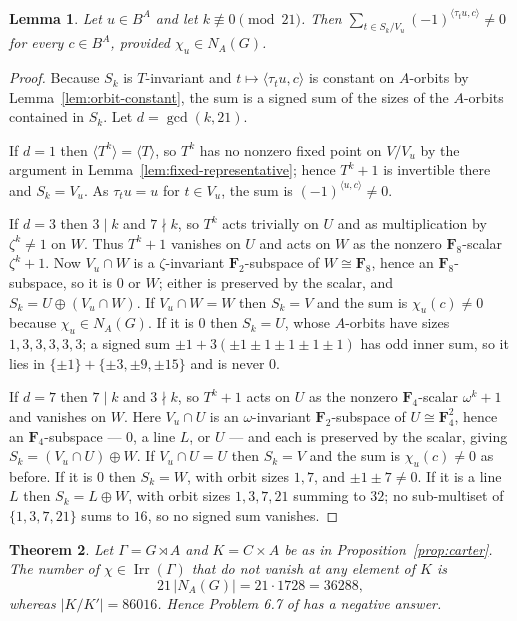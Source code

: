 \documentclass[11pt]{article}
\newtheorem{theorem}{Theorem}[section]
\newtheorem{lemma}[theorem]{Lemma}
\theoremstyle{definition}
\theoremstyle{remark}
\newcommand{\F}{\mathbf F}
\newcommand{\Irr}{\operatorname{Irr}}
\begin{document}
\begin{lemma}\label{lem:k-nonzero}
Let $u\in B^A$ and let $k\not\equiv0\pmod{21}$.  Then
$\sum_{t\in S_k/V_u}(-1)^{\langle\tau_tu,c\rangle}\neq0$ for every
$c\in B^A$, provided $\chi_u\in N_A(G)$.
\end{lemma}

\begin{proof}
Because $S_k$ is $T$-invariant and $t\mapsto\langle\tau_tu,c\rangle$ is
constant on $A$-orbits by Lemma~\ref{lem:orbit-constant}, the sum is a
signed sum of the sizes of the $A$-orbits contained in $S_k$.  Let
$d=\gcd(k,21)$.

If $d=1$ then $\langle T^k\rangle=\langle T\rangle$, so $T^k$ has no
nonzero fixed point on $V/V_u$ by the argument in
Lemma~\ref{lem:fixed-representative}; hence $T^k+1$ is invertible there
and $S_k=V_u$.  As $\tau_tu=u$ for $t\in V_u$, the sum is
$(-1)^{\langle u,c\rangle}\neq0$.

If $d=3$ then $3\mid k$ and $7\nmid k$, so $T^k$ acts trivially on $U$
and as multiplication by $\zeta^k\neq1$ on $W$.  Thus $T^k+1$ vanishes
on $U$ and acts on $W$ as the nonzero $\F_8$-scalar $\zeta^k+1$.  Now
$V_u\cap W$ is a $\zeta$-invariant $\F_2$-subspace of $W\cong\F_8$,
hence an $\F_8$-subspace, so it is $0$ or $W$; either is preserved by
the scalar, and $S_k=U\oplus(V_u\cap W)$.  If $V_u\cap W=W$ then
$S_k=V$ and the sum is
$\chi_u(c)\neq0$ because $\chi_u\in N_A(G)$.  If it is $0$ then $S_k=U$,
whose $A$-orbits have sizes $1,3,3,3,3,3$; a signed sum
$\pm1+3(\pm1\pm1\pm1\pm1\pm1)$ has odd inner sum, so it lies in
$\{\pm1\}+\{\pm3,\pm9,\pm15\}$ and is never $0$.

If $d=7$ then $7\mid k$ and $3\nmid k$, so $T^k+1$ acts on $U$ as the
nonzero $\F_4$-scalar $\omega^k+1$ and vanishes on $W$.  Here
$V_u\cap U$ is an $\omega$-invariant $\F_2$-subspace of
$U\cong\F_4^2$, hence an $\F_4$-subspace --- $0$, a line $L$, or
$U$ --- and each is preserved by the scalar, giving
$S_k=(V_u\cap U)\oplus W$.  If $V_u\cap U=U$ then $S_k=V$ and the sum
is
$\chi_u(c)\neq0$ as before.  If it is $0$ then $S_k=W$, with orbit sizes
$1,7$, and $\pm1\pm7\neq0$.  If it is a line $L$ then $S_k=L\oplus W$,
with orbit sizes $1,3,7,21$ summing to $32$; no sub-multiset of
$\{1,3,7,21\}$ sums to $16$, so no signed sum vanishes.
\end{proof}

\begin{theorem}\label{thm:carter}
Let $\Gamma=G\rtimes A$ and $K=C\times A$ be as in
Proposition~\ref{prop:carter}.  The number of $\chi\in\Irr(\Gamma)$ that
do not vanish at any element of $K$ is
\[
 21\,|N_A(G)|=21\cdot1728=36288,
\]
whereas $|K/K'|=86016$.  Hence Problem 6.7 of \cite{navarro-problems}
has a negative answer.
\end{theorem}
\end{document}
